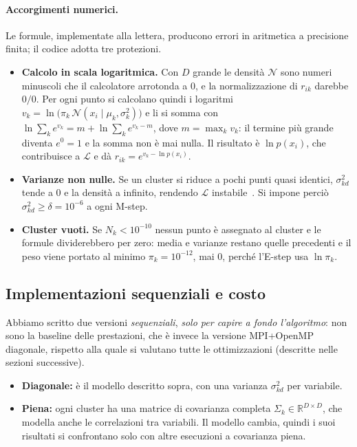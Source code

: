 \documentclass[conference]{IEEEtran}
\begin{document}
\paragraph{Accorgimenti numerici.} Le formule, implementate alla lettera, producono errori in aritmetica a precisione finita; il codice adotta tre protezioni.
\begin{itemize}
\item \textbf{Calcolo in scala logaritmica.} Con $D$ grande le densità $\mathcal{N}$ sono numeri minuscoli che il calcolatore arrotonda a 0, e la normalizzazione di $r_{ik}$ darebbe $0/0$. Per ogni punto si calcolano quindi i logaritmi $v_k=\ln\big(\pi_k\,\mathcal{N}(x_i\mid\mu_k,\sigma_k^2)\big)$ e li si somma con
$\ln\sum_{k}e^{v_k}=m+\ln\sum_{k}e^{v_k-m}$, dove $m=\max_k v_k$: il termine più grande diventa $e^0=1$ e la somma non è mai nulla. Il risultato è $\ln p(x_i)$, che contribuisce a $\mathcal{L}$ e dà $r_{ik}=e^{v_k-\ln p(x_i)}$.
\item \textbf{Varianze non nulle.} Se un cluster si riduce a pochi punti quasi identici, $\sigma^2_{kd}$ tende a 0 e la densità a infinito, rendendo $\mathcal{L}$ instabile~\cite[Sez.~9.2.1]{bishop}. Si impone perciò $\sigma^2_{kd}\ge\delta=10^{-6}$ a ogni M-step.
\item \textbf{Cluster vuoti.} Se $N_k<10^{-10}$ nessun punto è assegnato al cluster e le formule dividerebbero per zero: media e varianze restano quelle precedenti e il peso viene portato al minimo $\pi_k=10^{-12}$, mai 0, perché l'E-step usa $\ln\pi_k$.
\end{itemize}

\subsection{Implementazioni sequenziali e costo}
Abbiamo scritto due versioni \emph{sequenziali}, \emph{solo per capire a fondo l'algoritmo}: non sono la baseline delle prestazioni, che è invece la versione MPI+OpenMP diagonale, rispetto alla quale si valutano tutte le ottimizzazioni (descritte nelle sezioni successive).
\begin{itemize}
\item \textbf{Diagonale:} è il modello descritto sopra, con una varianza $\sigma^2_{kd}$ per variabile.
\item \textbf{Piena:} ogni cluster ha una matrice di covarianza completa $\Sigma_k\in\mathbb{R}^{D\times D}$, che modella anche le correlazioni tra variabili. Il modello cambia, quindi i suoi risultati si confrontano solo con altre esecuzioni a covarianza piena.
\end{itemize}
\end{document}
